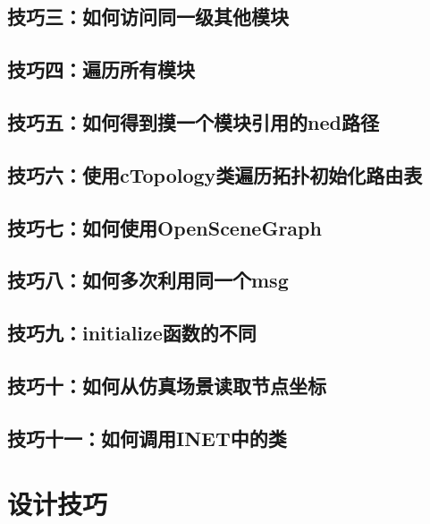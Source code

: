 \subsection{技巧三：如何访问同一级其他模块}
\subsection{技巧四：遍历所有模块}
\subsection{技巧五：如何得到摸一个模块引用的ned路径}

\subsection{技巧六：使用cTopology类遍历拓扑初始化路由表}

\subsection{技巧七：如何使用OpenSceneGraph}
\subsection{技巧八：如何多次利用同一个msg}

\subsection{技巧九：initialize函数的不同}
\subsection{技巧十：如何从仿真场景读取节点坐标}
\subsection{技巧十一：如何调用INET中的类}




\section{设计技巧}







